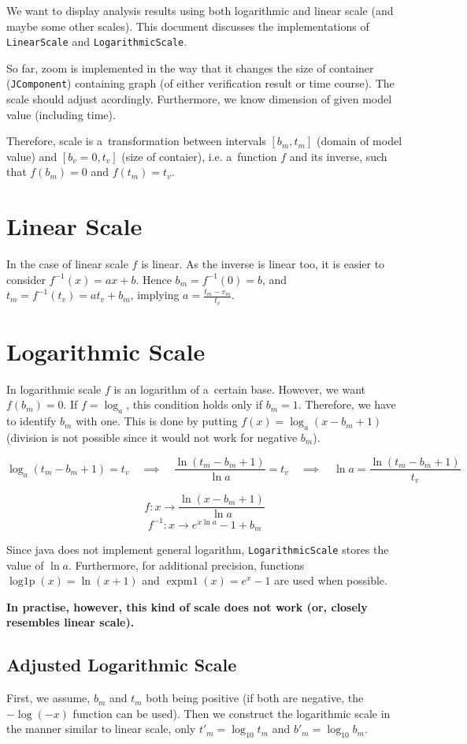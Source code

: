 \documentclass{article}
\begin{document}
We want to display analysis results using both logarithmic and linear scale (and maybe some other scales).
This document discusses the implementations of \texttt{LinearScale} and \texttt{LogarithmicScale}.

So far, zoom is implemented in the way that it changes the size of container (\texttt{JComponent}) containing
graph (of either verification result or time course). The scale should adjust acordingly. Furthermore,
we know dimension of given model value (including time).

Therefore, scale is a~transformation between intervals $[b_m,t_m]$ (domain of model value) and $[b_v=0,t_v]$ (size of contaier),
i.e. a~function $f$ and its inverse, such that $f(b_m)=0$ and $f(t_m)=t_v$.

\section{Linear Scale}
In the case of linear scale $f$ is linear. As the inverse is linear too, it is easier to consider $f^{-1}(x)=ax+b$.
Hence $b_m=f^{-1}(0)=b$, and $t_m=f^{-1}(t_v)=at_v+b_m$, implying $a=\frac{t_m-v_m}{t_v}$.

\section{Logarithmic Scale}
In logarithmic scale $f$ is an logarithm of a~certain base. However, we want $f(b_m)=0$. If $f=\log_a$, this condition holds
only if $b_m=1$. Therefore, we have to identify $b_m$ with one. This is done by putting $f(x)=\log_a(x-b_m+1)$ (division is not
possible since it would not work for negative $b_m$).

$$\log_a(t_m-b_m+1)=t_v \quad\implies\quad \frac{\ln (t_m-b_m+1)}{\ln a}=t_v \quad\implies\quad \ln a=\frac{\ln(t_m-b_m+1)}{t_v}$$

$$f:x\to\frac{\ln(x-b_m+1)}{\ln a}$$
$$f^{-1}:x\to e^{x\ln a}-1+b_m$$

Since java does not implement general logarithm, \texttt{LogarithmicScale} stores the value of $\ln a$. Furthermore, for additional precision,
functions $\operatorname{log1p}(x)=\ln(x+1)$ and $\operatorname{expm1}(x)=e^x-1$ are used when possible.

\textbf{In practise, however, this kind of scale does not work (or, closely resembles linear scale).}

\subsection{Adjusted Logarithmic Scale}
First, we assume, $b_m$ and $t_m$ both being positive (if both are negative, the $-\log(-x)$ function can be used).
Then we construct the logarithmic scale in the manner similar to linear scale, only $t'_m=\log_{10} t_m$ and $b'_m=\log_{10} b_m$.
\end{document}
